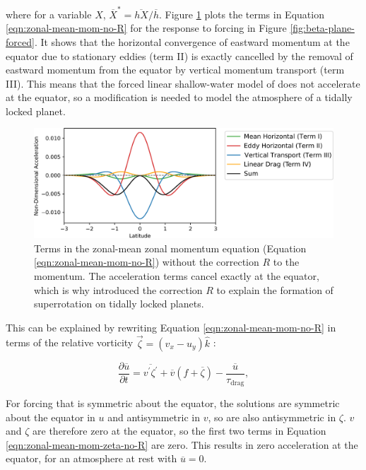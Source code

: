 where for a variable $X$, $\overline{X}^{*} = \overline{h X} / \overline{h}$. Figure \ref{fig:beta-fluxes-no-R} plots the terms in Equation \ref{eqn:zonal-mean-mom-no-R} for the response to forcing in Figure \ref{fig:beta-plane-forced}. It shows that the horizontal convergence of eastward momentum at the equator due to stationary eddies (term II) is exactly cancelled by the removal of eastward momentum from the equator by vertical momentum transport (term III). This means that the forced linear shallow-water model of \citet{matsuno1966quasi} does not accelerate at the equator, so a modification is needed to model the atmosphere of a tidally locked planet.

\begin{figure}
  \centering
  \includegraphics[width=1.0\textwidth]{figures/eqm-zonal-flow/beta-fluxes-no-R.pdf}
  \caption{Terms in the zonal-mean zonal momentum equation (Equation \ref{eqn:zonal-mean-mom-no-R}) without the correction $R$ to the momentum. The acceleration terms cancel exactly at the equator, which is why \citet{showman2010superrotation} introduced the correction $R$ to explain the formation of superrotation on tidally locked planets.}
  \label{fig:beta-fluxes-no-R}
\end{figure}

This can be explained by rewriting Equation \ref{eqn:zonal-mean-mom-no-R} in terms of the relative vorticity $\vec{\zeta}=\left(v_{x}-u_{y}\right) \hat{k}$ \citep{showman2011superrotation}:

\begin{equation}\label{eqn:zonal-mean-mom-zeta-no-R}
  \frac{\partial \overline{u}}{\partial t}=\overline{v^{\prime} \zeta^{\prime}}+\overline{v}(f+\overline{\zeta})-\frac{\overline{u}}{\tau_{\mathrm{drag}}},
\end{equation}

For forcing that is symmetric about the equator, the solutions are symmetric about the equator in $u$ and antisymmetric in $v$, so are also antisymmetric in $\zeta$. $v$ and $\zeta$ are therefore zero at the equator, so the first two terms in Equation \ref{eqn:zonal-mean-mom-zeta-no-R} are zero. This results in zero acceleration at the equator, for an atmosphere at rest with $\overline{u} = 0$.

